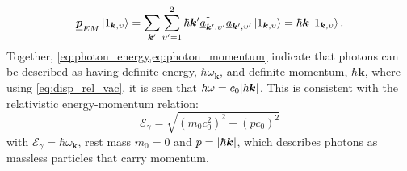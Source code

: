\begin{equation}\label{eq:photon_momentum}
 \underline{\mathbold{p}}_{EM} \ket{1_{\mathbold{k},\upsilon}} = \sum_{\mathbold{k}'} \sum_{\upsilon' = 1}^2 \hbar \mathbold{k}' \underline{a}^{\dagger}_{\mathbold{k}',\upsilon'} \underline{a}_{\mathbold{k}',\upsilon'} \ket{1_{\mathbold{k},\upsilon}} = \hbar \mathbold{k} \ket{1_{\mathbold{k},\upsilon}} .
 \end{equation}
Together, \cref{eq:photon_energy,eq:photon_momentum} indicate that photons can be described as having definite energy, $\hbar \omega_{\mathbold{k}}$, and definite momentum, $\hbar \mathbold{k}$, where using \cref{eq:disp_rel_vac}, it is seen that $\hbar \omega = c_0 \abs{\hbar \mathbold{k}}$.  
This is consistent with the relativistic energy-momentum relation:
\begin{equation}
 \mathcal{E}_{\gamma} = \sqrt{\left( m_0 c_0^2 \right)^2 + \left( p c_0 \right)^2}
 \end{equation}
with $\mathcal{E}_{\gamma} = \hbar \omega_{\mathbold{k}}$, rest mass $m_0=0$ and $p = \abs{\hbar \mathbold{k}}$, which describes photons as massless particles that carry momentum. 

